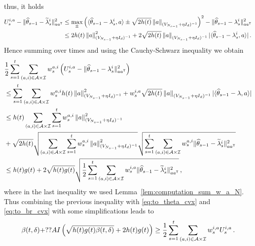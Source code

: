 thus, it holds
\begin{align*}
U_s^{i,a} -\Vert \widehat{\theta}_{s-1} - \widetilde{\lambda}_s^i\Vert_{a a^{\mathsf{\scriptscriptstyle T}}}^2
&\leq   \max_\pm \left( \langle \widehat{\theta}_{s-1} - \lambda^i_s,a\rangle \pm \sqrt{2 h(t)} \left\lVert a\right\rVert_{(V_{N_{s-1}}+ \eta I_d)^{-1}} \right)^2-\Vert \widehat{\theta}_{s-1} - \lambda_s^i\Vert_{a a^{\mathsf{\scriptscriptstyle T}}}^2\\
&\leq  2h(t)\left\lVert a\right\rVert^2_{(V_{N_{s-1}}+ \eta I_d)^{-1}} + 2\sqrt{2 h(t)} \left\lVert a\right\rVert_{(V_{N_{s-1}}+ \eta I_d)^{-1}}| \langle \widehat{\theta}_{s-1} - \lambda_s^i,a\rangle|\,.\\
\end{align*}
Hence summing over times and using the Cauchy-Schwarz inequality we obtain
\begin{align*}
&\frac{1}{2}\sum_{s=1}^t\sum_{(a,i)\in\mathcal{A}\times\mathcal{I}} w_s^{a,i}\left(U_s^{i,a} -\Vert \widehat{\theta}_{s-1} - \lambda_s^i\Vert_{a a^{\mathsf{\scriptscriptstyle T}}}^2\right)
\\
&\leq\sum_{s=1}^t \sum_{(a,i)\in\mathcal{A}\times\mathcal{I}} w_s^{a,i}h(t)\left\lVert a\right\rVert^2_{(V_{N_{s-1}}+ \eta I_d)^{-1}} +w_s^{i,a} \sqrt{2 h(t)} \left\lVert a\right\rVert_{(V_{N_{s-1}}+ \eta I_d)^{-1}}| \langle \widehat{\theta}_{s-1} - \lambda,a\rangle|
\\
&\leq h(t) \sum_{(a,i)\in\mathcal{A}\times\mathcal{I}} \sum_{s=1}^t w_s^{a,i}\left\lVert a\right\rVert^2_{(V_{N_{s-1}}+ \eta I_d)^{-1}}\\
&+ \sqrt{2 h(t)} \sqrt{\sum_{(a,i)\in\mathcal{A}\times\mathcal{I}} \sum_{s=1}^t w_s^{a,i}\left\lVert a\right\rVert^2_{(V_{N_{s-1}}+ \eta I_d)^{-1}}}  \sqrt{\sum_{s=1}^t \sum_{(a,i)\in\mathcal{A}\times\mathcal{I}} w_s^{a,i}\Vert \widehat{\theta}_{s-1} - \widetilde{\lambda}_s^i \Vert_{a a^{\mathsf{\scriptscriptstyle T}}}^2} \\
&\leq h(t)g(t) +2\sqrt{ h(t) g(t)}  \sqrt{\frac{1}{2}\sum_{s=1}^t \sum_{(a,i)\in\mathcal{A}\times\mathcal{I}} w_s^{i,a}\Vert \widehat{\theta}_{s-1} - \widetilde{\lambda}_s^i \Vert_{a a^{\mathsf{\scriptscriptstyle T}}}^2}\,,
\end{align*}
where in the last inequality we used Lemma~\ref{lem:computation_sum_w_a_N}. Thus combining the previous inequality with \eqref{eq:to_theta_cvx} and \ref{eq:to_br_cvx} with some simplifications leads to
\begin{equation}
\beta(t,\delta) + ?? AI \left(\sqrt{h(t)g(t) \beta(t,\delta)}+ 2h(t)g(t)\right)  \geq \frac{1}{2}\sum_{s=1}^t\sum_{(a,i)\in\mathcal{A}\times\mathcal{I}} w_s^{i,a}U_s^{i,a}\,.\label{eq:to_UCB_cvx}
\end{equation}


